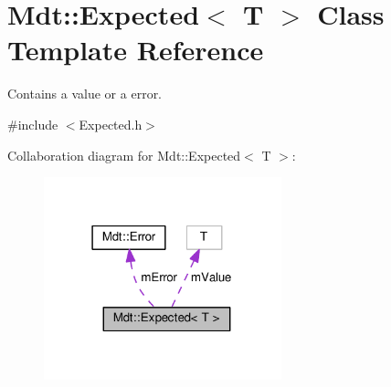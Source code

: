 \hypertarget{class_mdt_1_1_expected}{}\section{Mdt\+:\+:Expected$<$ T $>$ Class Template Reference}
\label{class_mdt_1_1_expected}


Contains a value or a error.  




{\ttfamily \#include $<$Expected.\+h$>$}



Collaboration diagram for Mdt\+:\+:Expected$<$ T $>$\+:\nopagebreak
\begin{figure}[H]
\begin{center}
\leavevmode
\includegraphics[width=195pt]{class_mdt_1_1_expected__coll__graph}
\end{center}
\end{figure}
